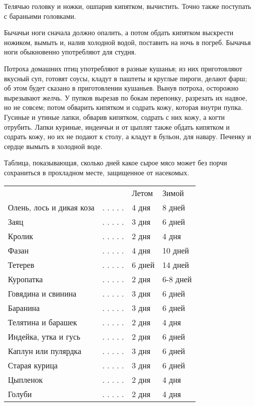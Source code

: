 Телячью головку и ножки, ошпарив кипятком, вычистить. Точно также поступать с бараньими головками.

Бычачьи ноги сначала должно опалить, а потом обдать кипятком выскрести ножиком, вымыть и, налив холодной водой, поставить на ночь в погреб. Бычачья ноги обыкновенно употребляют для студня.

Потроха домашних птиц употребляют в разные кушанья; из них приготовляют вкусный суп, готовят соусы, кладут в паштеты и круглые пироги, делают фарш; об этом будет сказано в приготовлении кушаньев. Вынув потроха, осторожно вырезывают желчь. У пупков вырезав по бокам перепонку, разрезать их надвое, но не совсем; потом обварить кипятком и содрать кожу, которая внутри пупка. Гусиные и утиные лапки, обварив кипятком, содрать с них кожу, а когти отрубить. Лапки куриные, индеичьи и от цыплят также обдать кипятком и содрать кожу, но их не подают к столу, а кладут в бульон, для навару. Печенку и сердце вымыть в холодной воде.

Таблица, показывающая, сколько дней какое сырое мясо может без порчи сохраниться в прохладном месте, защищенное от насекомых.

\begin{table}[h]
	\begin{center}
		\begin{tabular}{lcll} 
  		  &  & Летом & Зимой  \\ 
  		Олень, лось и дикая коза & . . . . . & 4 дня & 8 дней  \\ 
        Заяц & . . . . . & 3 дня & 6 дней\\  
        Кролик & . . . . . & 2 дня & 4 дня\\  
        Фазан & . . . . . &	4 дня & 10 дней \\  
        Тетерев & . . . . . & 6 дней & 14 дней \\  
        Куропатка & . . . . . & 2 дня & 6-8 дней \\  
        Говядина и свинина & . . . . . & 3 дня & 6 дней \\  
        Баранина & . . . . . & 3 дня & 6 дней \\  
        Телятина и барашек & . . . . . & 2 дня & 4 дня \\  
        Индейка, утка и гусь & . . . . . & 2 дня & 6 дней \\  
        Каплун или пулярдка & . . . . . & 3 дня & 6 дней \\  
        Старая курица & . . . . . & 3 дня & 6 дней \\  
        Цыпленок & . . . . . & 2 дня & 4 дня \\   
        Голуби & . . . . . & 2 дня & 4 дня \\ 
		\end{tabular}
	\end{center}
\end{table}

